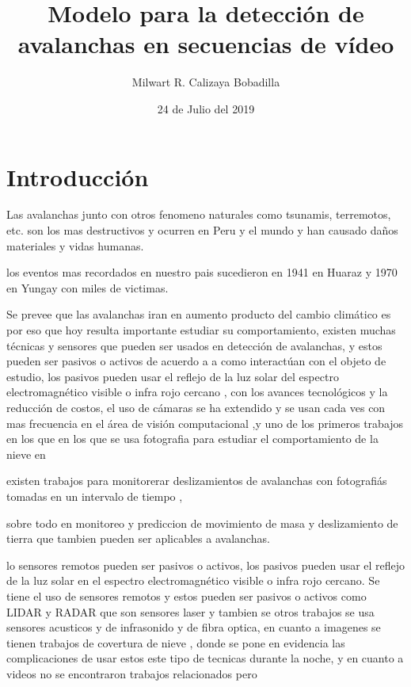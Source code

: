 \documentclass[a4paper,11pt]{report}
\title{Modelo para la detección de avalanchas en secuencias de vídeo }
\author{Milwart R. Calizaya Bobadilla}
\date{\small{24 de Julio del 2019}}
\begin{document}
\maketitle


 \chapter{Introducción}
Las avalanchas junto con otros fenomeno naturales como tsunamis, terremotos, etc. son los mas destructivos  y ocurren en Peru y el mundo y han causado daños materiales y vidas humanas. 

los eventos mas recordados en nuestro pais sucedieron  en 1941 en Huaraz y 1970 en Yungay con miles de victimas. 


Se prevee que las avalanchas iran en aumento producto del cambio climático es por eso que hoy resulta importante estudiar su comportamiento, existen muchas técnicas y sensores que pueden ser usados en detección de avalanchas,  y estos pueden ser pasivos o activos de acuerdo a a como interactúan con el objeto de estudio, los pasivos pueden usar el reflejo de la luz solar del espectro electromagnético visible o infra rojo cercano \cite{Fuchs2019}, con los avances tecnológicos y la reducción de costos, el uso de cámaras se ha extendido y se usan cada ves con mas frecuencia en el área de visión computacional  \cite{Jesus2018},y uno de los primeros trabajos en los que en los que se usa fotografia para estudiar el comportamiento de la nieve en  

existen trabajos para monitorerar  deslizamientos de avalanchas con fotografiás tomadas en un  intervalo  de tiempo \cite{Thesis2014,Herwijnen2012,Herwijnen2013}, 

 
sobre todo en  monitoreo y prediccion de movimiento de masa y deslizamiento de tierra que tambien pueden ser aplicables a avalanchas.


lo sensores remotos pueden ser pasivos o activos, los pasivos pueden usar el reflejo de la luz solar en el espectro electromagnético visible  o infra rojo cercano. 
Se tiene el uso de sensores remotos y estos pueden ser pasivos o activos  como LIDAR y RADAR  que son sensores laser y tambien se otros trabajos se usa sensores acusticos y de infrasonido y de fibra optica, en cuanto a imagenes se tienen trabajos de covertura de nieve \cite{Christiansen2001}, \cite{Bessason2007} donde se pone en evidencia las complicaciones de usar estos este tipo de tecnicas durante la noche, y en cuanto a videos no se encontraron trabajos relacionados pero
\end{document}
